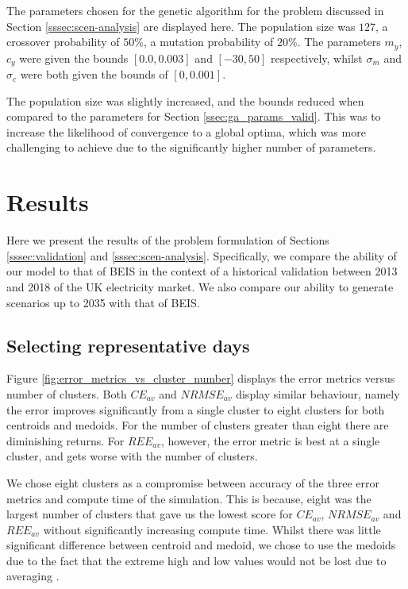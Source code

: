 The parameters chosen for the genetic algorithm for the problem discussed in Section \ref{sssec:scen-analysis} are displayed here. The population size was $127$, a crossover probability of $50\%$, a mutation probability of $20\%$. The parameters $m_y$, $c_y$ were given the bounds $[0.0, 0.003]$ and $[-30, 50]$ respectively, whilst $\sigma_m$ and $\sigma_c$ were both given the bounds of $[0, 0.001]$.

The population size was slightly increased, and the bounds reduced when compared to the parameters for Section \ref{ssec:ga_params_valid}. This was to increase the likelihood of convergence to a global optima, which was more challenging to achieve due to the significantly higher number of parameters.


\section{Results}
\label{sec:results}

Here we present the results of the problem formulation of Sections \ref{sssec:validation} and  \ref{sssec:scen-analysis}. Specifically, we compare the ability of our model to that of BEIS in the context of a historical validation between 2013 and 2018 of the UK electricity market. We also compare our ability to generate scenarios up to 2035 with that of BEIS. 

\subsection{Selecting representative days}
\label{ssec:res_repr_days}

Figure \ref{fig:error_metrics_vs_cluster_number} displays the error metrics versus number of clusters. Both $CE_{av}$ and $NRMSE_{av}$ display similar behaviour, namely the error improves significantly from a single cluster to eight clusters for both centroids and medoids. For the number of clusters greater than eight there are diminishing returns. For $REE_{av}$, however, the error metric is best at a single cluster, and gets worse with the number of clusters. 



We chose eight clusters as a compromise between accuracy of the three error metrics and compute time of the simulation. This is because, eight was the largest number of clusters that gave us the lowest score for $CE_{av}$, $NRMSE_{av}$ and $REE_{av}$ without significantly increasing compute time. Whilst there was little significant difference between centroid and medoid, we chose to use the medoids due to the fact that the extreme high and low values would not be lost due to averaging \cite{Hilbers2019}.




